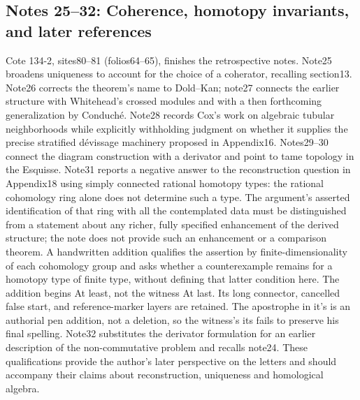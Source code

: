 \subsection*{Notes 25--32: Coherence, homotopy invariants, and later references}
Cote 134-2, sites80--81 (folios64--65), finishes the retrospective notes. Note25 broadens uniqueness to account for the choice of a coherator, recalling section13. Note26 corrects the theorem's name to Dold--Kan; note27 connects the earlier structure with Whitehead's crossed modules and with a then forthcoming generalization by Conduché. Note28 records Cox's work on algebraic tubular neighborhoods while explicitly withholding judgment on whether it supplies the precise stratified dévissage machinery proposed in Appendix16. Notes29--30 connect the diagram construction with a derivator and point to tame topology in the Esquisse. Note31 reports a negative answer to the reconstruction question in Appendix18 using simply connected rational homotopy types: the rational cohomology ring alone does not determine such a type. The argument's asserted identification of that ring with all the contemplated data must be distinguished from a statement about any richer, fully specified enhancement of the derived structure; the note does not provide such an enhancement or a comparison theorem. A handwritten addition qualifies the assertion by finite-dimensionality of each cohomology group and asks whether a counterexample remains for a homotopy type of finite type, without defining that latter condition here. The addition begins At least, not the witness At last. Its long connector, cancelled false start, and reference-marker layers are retained. The apostrophe in it's is an authorial pen addition, not a deletion, so the witness's its fails to preserve his final spelling. Note32 substitutes the derivator formulation for an earlier description of the non-commutative problem and recalls note24. These qualifications provide the author's later perspective on the letters and should accompany their claims about reconstruction, uniqueness and homological algebra.
